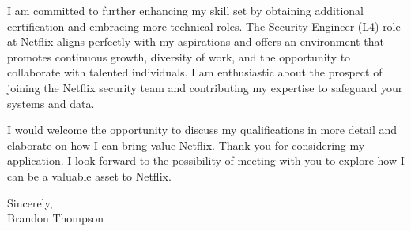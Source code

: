 \documentclass{resume} %
\newcommand\company{Netflix}
\newcommand\position{Security Engineer (L4)}
\begin{document}
I am committed to further enhancing my skill set by obtaining additional certification and embracing more technical roles. The \position{} role at \company{} aligns perfectly with my aspirations and offers an environment that promotes continuous growth, diversity of work, and the opportunity to collaborate with talented individuals.
I am enthusiastic about the prospect of joining the \company{} security team and contributing my expertise to safeguard your systems and data.

I would welcome the opportunity to discuss my qualifications in more detail and elaborate on how I can bring value \company{}. Thank you for considering my application.
I look forward to the possibility of meeting with you to explore how I can be a valuable asset to \company{}. 

Sincerely,\\
Brandon Thompson
\end{document}
